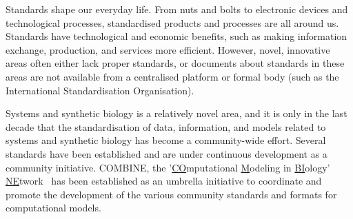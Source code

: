 \documentclass{jib}
\begin{document}
%
%

\begin{jibtitlepage}



\end{jibtitlepage}

Standards shape our everyday life. From nuts and bolts to electronic devices and technological processes, standardised products and processes are all around us. Standards have technological and economic benefits, such as making information exchange, production, and services more efficient. However, novel, innovative areas often either lack proper standards, or documents about standards in these areas are not available from a centralised platform or formal body (such as the International Standardisation Organisation). 

Systems and synthetic biology is a relatively novel area, and it is only in the last decade that the standardisation of data, information, and models related to systems and synthetic biology has  become a community-wide effort. Several standards have been established and are under continuous development as a community initiative. COMBINE, the '\underline{CO}mputational \underline{M}odeling in \underline{BI}ology' \underline{NE}twork~\cite{hucka2015promoting} has been established as an umbrella  initiative to coordinate and promote the development of the various community standards and formats for computational models. 
\end{document}
